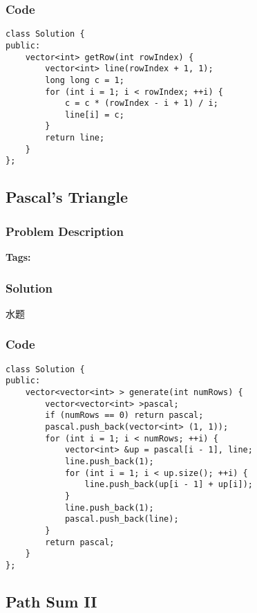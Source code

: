 \documentclass{article}
\begin{document}
\begin{CJK*}{UTF8}{gkai}
\subsubsection*{Code}
\begin{lstlisting}
class Solution {
public:
    vector<int> getRow(int rowIndex) {
        vector<int> line(rowIndex + 1, 1);
        long long c = 1;
        for (int i = 1; i < rowIndex; ++i) {
            c = c * (rowIndex - i + 1) / i;
            line[i] = c;
        }
        return line;
    }
}; 
\end{lstlisting}


\subsection{ Pascal's Triangle }
\label{ Pascal's Triangle }

\subsubsection*{Problem Description}

\textbf{Tags: }



\subsubsection*{Solution}
水题

\subsubsection*{Code}
\begin{lstlisting}
class Solution {
public:
    vector<vector<int> > generate(int numRows) {
        vector<vector<int> >pascal;
        if (numRows == 0) return pascal;
        pascal.push_back(vector<int> (1, 1));
        for (int i = 1; i < numRows; ++i) {
            vector<int> &up = pascal[i - 1], line;
            line.push_back(1);
            for (int i = 1; i < up.size(); ++i) {
                line.push_back(up[i - 1] + up[i]);
            }
            line.push_back(1);
            pascal.push_back(line);
        }
        return pascal;
    }
}; 
\end{lstlisting}


\subsection{ Path Sum II }
\label{ Path Sum II }


\end{CJK*}
\end{document}
